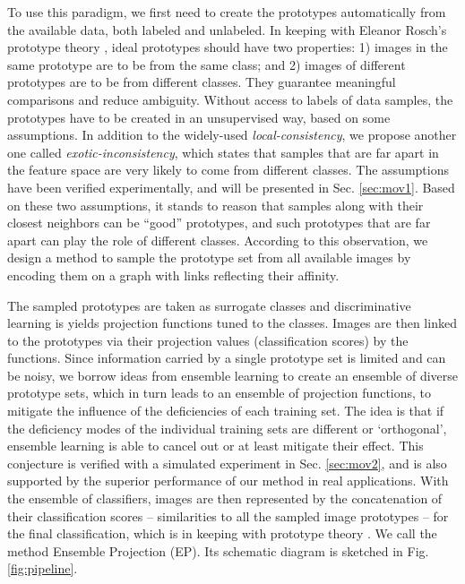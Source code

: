 To use this paradigm, we first need to create the prototypes
automatically from the available data, both labeled and unlabeled. In
keeping with Eleanor Rosch's prototype theory \citep{Rosch:1978}, ideal
prototypes should have two properties: 1) images in the same prototype
are to be from the same class; and 2) images of different
prototypes are to be from different classes. They 
guarantee meaningful comparisons and reduce ambiguity.  Without
access to labels of data samples, the prototypes have to be created in
an unsupervised way, based on some assumptions. In addition to the
widely-used \emph{local-consistency}, we propose another one called
\emph{exotic-inconsistency}, which states that samples that are far
apart in the feature space are very likely to come from
different classes. The assumptions have been verified
experimentally, and will be presented in Sec. \ref{sec:mov1}.  Based
on these two assumptions, it stands to reason that samples along with
their closest neighbors can be ``good'' prototypes, and  such
prototypes that are far apart can play the role of different classes.  According to
this observation, we design a method to sample the prototype set from
all available images by encoding them on a graph with links
reflecting their affinity.

The sampled prototypes are taken as surrogate classes and
discriminative learning is yields projection functions tuned to the
classes. Images are then linked to the prototypes via their projection
values (classification scores) by the functions. Since information
carried by a single prototype set is limited and can be noisy, we
borrow ideas from ensemble learning \citep{EnClasReview} to create an
ensemble of diverse prototype sets, which in turn leads to an ensemble
of projection functions, to mitigate the influence of the deficiencies
of each training set. The idea is that if the deficiency modes of the
individual training sets are different or `orthogonal', ensemble
learning is able to cancel out or at least mitigate their effect. This
conjecture is verified with a simulated experiment in
Sec. \ref{sec:mov2}, and is also supported by the superior performance
of our method in real applications. With the ensemble of classifiers,
images are then represented by the concatenation of their
classification scores -- similarities to all the sampled image
prototypes -- for the final classification, which is in keeping with
prototype theory \citep{Rosch:1978}. We call the method Ensemble
Projection (EP). Its schematic diagram is sketched in
Fig. \ref{fig:pipeline}.

